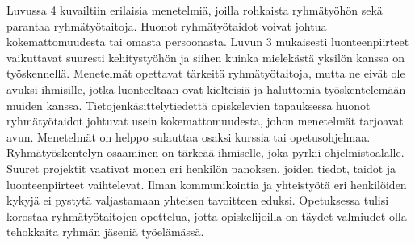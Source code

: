 \documentclass[finnish]{../tktltiki2}
\theoremstyle{definition}
\theoremstyle{remark}
\begin{document}
Luvussa 4 kuvailtiin erilaisia menetelmiä, joilla rohkaista ryhmätyöhön sekä parantaa ryhmätyötaitoja. Huonot ryhmätyötaidot voivat johtua kokemattomuudesta tai omasta persoonasta. Luvun 3 mukaisesti luonteenpiirteet vaikuttavat suuresti kehitystyöhön ja siihen kuinka mielekästä yksilön kanssa on työskennellä. Menetelmät opettavat tärkeitä ryhmätyötaitoja, mutta ne eivät ole avuksi ihmisille, jotka luonteeltaan ovat kielteisiä ja haluttomia työskentelemään muiden kanssa. Tietojenkäsittelytiedettä opiskelevien tapauksessa huonot ryhmätyötaidot johtuvat usein kokemattomuudesta, johon menetelmät tarjoavat avun. Menetelmät on helppo sulauttaa osaksi kurssia tai opetusohjelmaa.\\

Ryhmätyöskentelyn osaaminen on tärkeää ihmiselle, joka pyrkii ohjelmistoalalle. Suuret projektit vaativat monen eri henkilön panoksen, joiden tiedot, taidot ja luonteenpiirteet vaihtelevat. Ilman kommunikointia ja yhteistyötä eri henkilöiden kykyjä ei pystytä valjastamaan yhteisen tavoitteen eduksi. Opetuksessa tulisi korostaa ryhmätyötaitojen opettelua, jotta opiskelijoilla on täydet valmiudet olla tehokkaita ryhmän jäseniä työelämässä.

\pagebreak

%
%
% 
%



\end{document}
